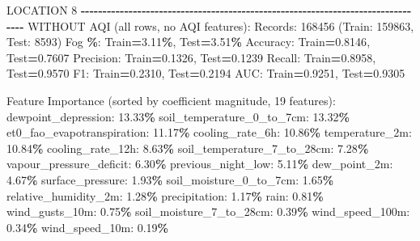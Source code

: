 \documentclass[
  letterpaper,
  DIV=11,
  numbers=noendperiod]{scrartcl}
\newenvironment{Shaded}{\begin{snugshade}}{\end{snugshade}}
\newcommand{\BuiltInTok}[1]{#1}
\newcommand{\DecValTok}[1]{\textcolor[rgb]{0.00,0.00,0.81}{#1}}
\newcommand{\FloatTok}[1]{\textcolor[rgb]{0.00,0.00,0.81}{#1}}
\newcommand{\NormalTok}[1]{#1}
\newcommand{\OperatorTok}[1]{\textcolor[rgb]{0.81,0.36,0.00}{\textbf{#1}}}
\begin{document}
\begin{Shaded}
\begin{Highlighting}[]
\NormalTok{LOCATION }\DecValTok{8}
\OperatorTok{{-}{-}{-}{-}{-}{-}{-}{-}{-}{-}{-}{-}{-}{-}{-}{-}{-}{-}{-}{-}{-}{-}{-}{-}{-}{-}{-}{-}{-}{-}{-}{-}{-}{-}{-}{-}{-}{-}{-}{-}{-}{-}{-}{-}{-}{-}{-}{-}{-}{-}{-}{-}{-}{-}{-}{-}{-}{-}{-}{-}{-}{-}{-}{-}{-}{-}{-}{-}{-}{-}{-}{-}{-}{-}{-}{-}{-}{-}{-}{-}}
\NormalTok{WITHOUT AQI (}\BuiltInTok{all}\NormalTok{ rows, no AQI features):}
\NormalTok{  Records: }\DecValTok{168456}\NormalTok{ (Train: }\DecValTok{159863}\NormalTok{, Test: }\DecValTok{8593}\NormalTok{)}
\NormalTok{  Fog }\OperatorTok{\%}\NormalTok{: Train}\OperatorTok{=}\FloatTok{3.11}\OperatorTok{\%}\NormalTok{, Test}\OperatorTok{=}\FloatTok{3.51}\OperatorTok{\%}
\NormalTok{  Accuracy: Train}\OperatorTok{=}\FloatTok{0.8146}\NormalTok{, Test}\OperatorTok{=}\FloatTok{0.7607}
\NormalTok{  Precision: Train}\OperatorTok{=}\FloatTok{0.1326}\NormalTok{, Test}\OperatorTok{=}\FloatTok{0.1239}
\NormalTok{  Recall: Train}\OperatorTok{=}\FloatTok{0.8958}\NormalTok{, Test}\OperatorTok{=}\FloatTok{0.9570}
\NormalTok{  F1: Train}\OperatorTok{=}\FloatTok{0.2310}\NormalTok{, Test}\OperatorTok{=}\FloatTok{0.2194}
\NormalTok{  AUC: Train}\OperatorTok{=}\FloatTok{0.9251}\NormalTok{, Test}\OperatorTok{=}\FloatTok{0.9305}

\NormalTok{  Feature Importance (}\BuiltInTok{sorted}\NormalTok{ by coefficient magnitude, }\DecValTok{19}\NormalTok{ features):}
\NormalTok{    dewpoint\_depression: }\FloatTok{13.33}\OperatorTok{\%}
\NormalTok{    soil\_temperature\_0\_to\_7cm: }\FloatTok{13.32}\OperatorTok{\%}
\NormalTok{    et0\_fao\_evapotranspiration: }\FloatTok{11.17}\OperatorTok{\%}
\NormalTok{    cooling\_rate\_6h: }\FloatTok{10.86}\OperatorTok{\%}
\NormalTok{    temperature\_2m: }\FloatTok{10.84}\OperatorTok{\%}
\NormalTok{    cooling\_rate\_12h: }\FloatTok{8.63}\OperatorTok{\%}
\NormalTok{    soil\_temperature\_7\_to\_28cm: }\FloatTok{7.28}\OperatorTok{\%}
\NormalTok{    vapour\_pressure\_deficit: }\FloatTok{6.30}\OperatorTok{\%}
\NormalTok{    previous\_night\_low: }\FloatTok{5.11}\OperatorTok{\%}
\NormalTok{    dew\_point\_2m: }\FloatTok{4.67}\OperatorTok{\%}
\NormalTok{    surface\_pressure: }\FloatTok{1.93}\OperatorTok{\%}
\NormalTok{    soil\_moisture\_0\_to\_7cm: }\FloatTok{1.65}\OperatorTok{\%}
\NormalTok{    relative\_humidity\_2m: }\FloatTok{1.28}\OperatorTok{\%}
\NormalTok{    precipitation: }\FloatTok{1.17}\OperatorTok{\%}
\NormalTok{    rain: }\FloatTok{0.81}\OperatorTok{\%}
\NormalTok{    wind\_gusts\_10m: }\FloatTok{0.75}\OperatorTok{\%}
\NormalTok{    soil\_moisture\_7\_to\_28cm: }\FloatTok{0.39}\OperatorTok{\%}
\NormalTok{    wind\_speed\_100m: }\FloatTok{0.34}\OperatorTok{\%}
\NormalTok{    wind\_speed\_10m: }\FloatTok{0.19}\OperatorTok{\%}


\end{Highlighting}
\end{Shaded}
\end{document}
